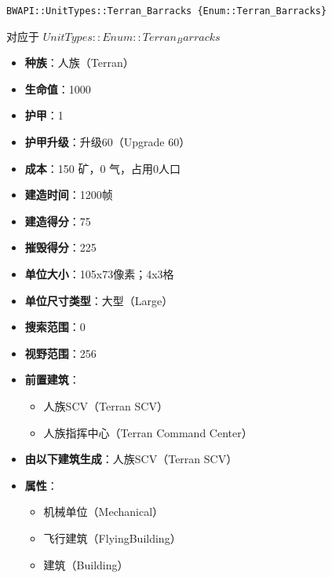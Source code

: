 \begin{tcolorbox}[colback=white, colframe=black!60!white, title=Terran\_Barracks(), arc=0mm]
    \begin{verbatim}
BWAPI::UnitTypes::Terran_Barracks {Enum::Terran_Barracks}
    \end{verbatim}
    对应于  $ UnitTypes::Enum::Terran_Barracks $ 
    \begin{itemize}
        \item \textbf{种族}：人族（Terran）
        \item \textbf{生命值}：1000
        \item \textbf{护甲}：1
        \item \textbf{护甲升级}：升级60（Upgrade 60）
        \item \textbf{成本}：150 矿，0 气，占用0人口
        \item \textbf{建造时间}：1200帧
        \item \textbf{建造得分}：75
        \item \textbf{摧毁得分}：225
        \item \textbf{单位大小}：105x73像素；4x3格
        \item \textbf{单位尺寸类型}：大型（Large）
        \item \textbf{搜索范围}：0
        \item \textbf{视野范围}：256
        \item \textbf{前置建筑}：
            \begin{itemize}
                \item 人族SCV（Terran SCV）
                \item 人族指挥中心（Terran Command Center）
            \end{itemize}
        \item \textbf{由以下建筑生成}：人族SCV（Terran SCV）
        \item \textbf{属性}：
            \begin{itemize}
                \item 机械单位（Mechanical）
                \item 飞行建筑（FlyingBuilding）
                \item 建筑（Building）
            \end{itemize}
    \end{itemize}
\end{tcolorbox}


